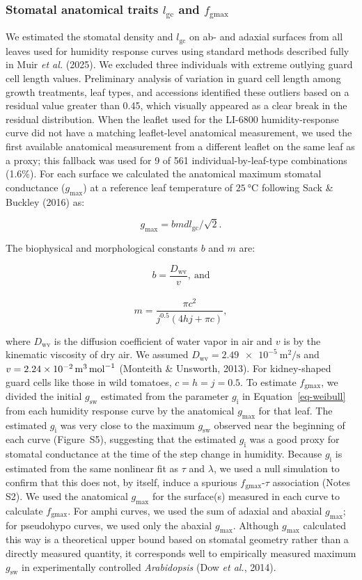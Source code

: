 \documentclass[
  letterpaper,
  DIV=11,
  numbers=noendperiod]{scrartcl}
\newcommand{\fgmax}{$f_\mathrm{gmax}$}
\newcommand{\gcl}{$l_\mathrm{gc}$}
\newcommand{\gi}{$g_\mathrm{i}$}
\newcommand{\gmax}{$g_\mathrm{max}$}
\newcommand{\gsw}{$g_\mathrm{sw}$}
\begin{document}
\subsubsection{\texorpdfstring{Stomatal anatomical traits \gcl{} and
\fgmax{}}{Stomatal anatomical traits  and }}\label{stomatal-anatomical-traits-and}

We estimated the stomatal density and \gcl{} on ab- and adaxial surfaces
from all leaves used for humidity response curves using standard methods
described fully in Muir \emph{et al.} (2025). We excluded three
individuals with extreme outlying guard cell length values. Preliminary
analysis of variation in guard cell length among growth treatments, leaf
types, and accessions identified these outliers based on a residual
value greater than 0.45, which visually appeared as a clear break in the
residual distribution. When the leaflet used for the LI-6800
humidity-response curve did not have a matching leaflet-level anatomical
measurement, we used the first available anatomical measurement from a
different leaflet on the same leaf as a proxy; this fallback was used
for 9 of 561 individual-by-leaf-type combinations (1.6\%). For each
surface we calculated the anatomical maximum stomatal conductance
(\gmax) at a reference leaf temperature of \(\SI{25}{\degreeCelsius}\)
following Sack \& Buckley (2016) as:

\[g_\mathrm{max} = b m d l_\mathrm{gc} / \sqrt{2}.\]

The biophysical and morphological constants \(b\) and \(m\) are:

\[b = \frac{D_\mathrm{wv}}{v},~\mathrm{and}\]\\
\[m = \frac{\pi c ^ 2}{j^{0.5} (4 h j + \pi c)},\]

where \(D_\mathrm{wv}\) is the diffusion coefficient of water vapor in
air and \(v\) is by the kinematic viscosity of dry air. We assumed
\(D_\mathrm{wv} = \SI{2.49e-5}{\meter\squared\per\second}\) and
\(v = \SI{2.24e-2}{\raiseto{3}\meter\per\mol}\) (Monteith \& Unsworth,
2013). For kidney-shaped guard cells like those in wild tomatoes,
\(c = h = j = 0.5\). To estimate \fgmax, we divided the initial \gsw{}
estimated from the parameter \gi{} in Equation~\ref{eq-weibull} from
each humidity response curve by the anatomical \gmax{} for that leaf.
The estimated \gi{} was very close to the maximum \gsw{} observed near
the beginning of each curve (Figure~S5), suggesting
that the estimated \gi{} was a good proxy for stomatal conductance at
the time of the step change in humidity. Because \gi{} is estimated from
the same nonlinear fit as \(\tau\) and \(\lambda\), we used a null
simulation to confirm that this does not, by itself, induce a spurious
\fgmax{}-\(\tau\) association (Notes S2). We used the anatomical \gmax{}
for the surface(s) measured in each curve to calculate \fgmax. For amphi
curves, we used the sum of adaxial and abaxial \gmax{}; for pseudohypo
curves, we used only the abaxial \gmax{}. Although \gmax{} calculated
this way is a theoretical upper bound based on stomatal geometry rather
than a directly measured quantity, it corresponds well to empirically
measured maximum \gsw{} in experimentally controlled \emph{Arabidopsis}
(Dow \emph{et al.}, 2014).
\end{document}
